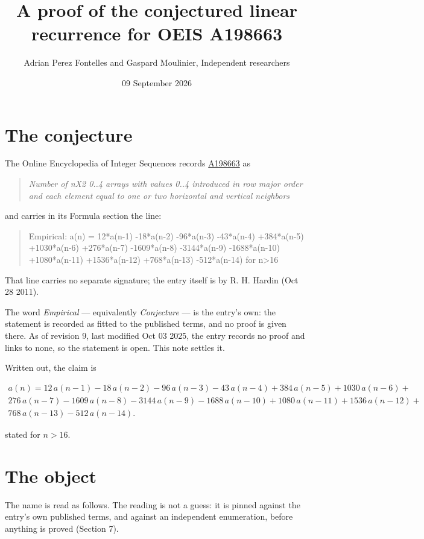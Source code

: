 \documentclass[11pt]{article}
\title{A proof of the conjectured linear recurrence for OEIS A198663}
\author{Adrian Perez Fontelles and Gaspard Moulinier, Independent researchers}
\date{09 September 2026}
\theoremstyle{definition}
\begin{document}
\maketitle
\section{The conjecture}

The Online Encyclopedia of Integer Sequences records \href{https://oeis.org/A198663}{A198663} as

\begin{quote}\itshape Number of nX2 0..4 arrays with values 0..4 introduced in row major order and each element equal to one or two horizontal and vertical neighbors\end{quote}

and carries in its Formula section the line:

\begin{quote}\ttfamily Empirical: a(n) = 12*a(n-1) -18*a(n-2) -96*a(n-3) -43*a(n-4) +384*a(n-5) +1030*a(n-6) +276*a(n-7) -1609*a(n-8) -3144*a(n-9) -1688*a(n-10) +1080*a(n-11) +1536*a(n-12) +768*a(n-13) -512*a(n-14) for n>16\end{quote}

That line carries no separate signature; the entry itself is by R. H. Hardin (Oct 28 2011).

The word {\itshape Empirical} --- equivalently {\itshape Conjecture} --- is the entry's own: the statement is recorded as fitted to the published terms, and no proof is given there. As of revision 9, last modified Oct 03 2025, the entry records no proof and links to none, so the statement is open. This note settles it.

Written out, the claim is

\begin{multline*} a(n) = 12\,a(n-1) - 18\,a(n-2) - 96\,a(n-3) - 43\,a(n-4) + 384\,a(n-5) + 1030\,a(n-6) + \\ 276\,a(n-7) - 1609\,a(n-8) - 3144\,a(n-9) - 1688\,a(n-10) + 1080\,a(n-11) + 1536\,a(n-12) + \\ 768\,a(n-13) - 512\,a(n-14). \end{multline*}

stated for $n > 16$.

\section{The object}

The name is read as follows. The reading is not a guess: it is pinned against the entry's own published terms, and against an independent enumeration, before anything is proved (Section 7).
\end{document}
